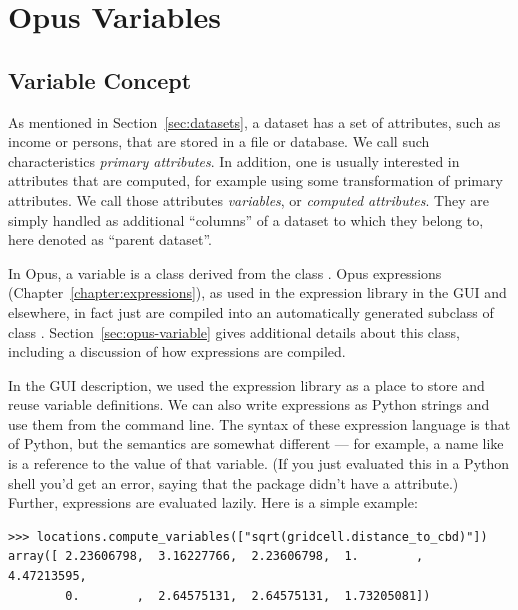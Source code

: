 %
\section{Opus Variables} 
%
\label{sec:variables}
%
\subsection{Variable Concept}
%
\label{sec:variableconcept}
%


As mentioned in Section~\ref{sec:datasets}, a dataset has a set of
attributes, such as income or persons, that are stored in a file or database.
We call such characteristics \emph{primary attributes}.  
In addition, one is usually interested in attributes that are computed, for example using some
transformation of primary attributes.  We call those attributes \emph{variables},
or \emph{computed attributes}.
They are simply handled as additional
``columns'' of a dataset to which they belong to, here denoted as
``parent dataset''.

In Opus, a variable is a class derived from the
 class .  Opus expressions 
(Chapter~\ref{chapter:expressions}),
as used in the expression library in the GUI and elsewhere, in fact just
are compiled into an automatically generated subclass of class .
Section~\ref{sec:opus-variable} gives additional details about this class, 
including a discussion of how expressions are compiled.

In the GUI description, we used the expression library as a place to store and
reuse variable definitions.  We can also write expressions as Python strings
and use them from the command line.  The syntax of these expression language is 
that of Python, but the semantics
are somewhat different --- for example, a name like
 is a reference to the value of that
variable.  (If you just evaluated this in a Python shell you'd get an
error, saying that the  package didn't have a
 attribute.)  Further, expressions are evaluated lazily.
Here is a simple example:

\begin{verbatim}
>>> locations.compute_variables(["sqrt(gridcell.distance_to_cbd)"])
array([ 2.23606798,  3.16227766,  2.23606798,  1.        ,  4.47213595,
        0.        ,  2.64575131,  2.64575131,  1.73205081])
\end{verbatim}

